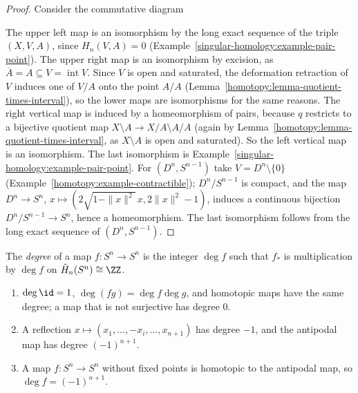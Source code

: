 \begin{proof}
Consider the commutative diagram
\begin{center}
\end{center}
The upper left map is an isomorphism by the long exact sequence of the triple $(X, V, A)$, since $H_n(V, A) = 0$ (Example~\ref{singular-homology:example-pair-point}). The
upper right map is an isomorphism by excision, as $\overline{A} = A \subseteq V = \operatorname{int}V$. Since $V$ is open and saturated, the deformation retraction of $V$
induces one of $V/A$ onto the point $A/A$ (Lemma~\ref{homotopy:lemma-quotient-times-interval}), so the lower maps are isomorphisms for the same reasons. The right
vertical map is induced by a homeomorphism of pairs, because $q$ restricts to a bijective quotient map $X \setminus A \to X/A \setminus A/A$ (again by
Lemma~\ref{homotopy:lemma-quotient-times-interval}, as $X \setminus A$ is open and saturated). So the left vertical map is an isomorphism. The last isomorphism is
Example~\ref{singular-homology:example-pair-point}. For $(D^n, S^{n-1})$ take $V = D^n \setminus \{0\}$ (Example~\ref{homotopy:example-contractible}); $D^n/S^{n-1}$ is
compact, and the map $D^n \to S^n$, $x \mapsto (2\sqrt{1 - \|x\|^2}\,x, 2\|x\|^2 - 1)$, induces a continuous bijection $D^n/S^{n-1} \to S^n$, hence a homeomorphism. The
last isomorphism follows from the long exact sequence of $(D^n, S^{n-1})$.
\end{proof}

\begin{definition}\label{singular-homology:definition-degree}
The \emph{degree} of a map $f \colon S^n \to S^n$ is the integer $\deg f$ such that $f_*$ is multiplication by $\deg f$ on $\tilde{H}_n(S^n) \cong \ZZ$.
\end{definition}

\begin{proposition}\label{singular-homology:proposition-degree}
\begin{enumerate}
\item $\deg \id = 1$, $\deg(fg) = \deg f \deg g$, and homotopic maps have the same degree; a map that is not surjective has degree $0$.
\item A reflection $x \mapsto (x_1, \ldots, -x_i, \ldots, x_{n+1})$ has degree $-1$, and the antipodal map has degree $(-1)^{n+1}$.
\item A map $f \colon S^n \to S^n$ without fixed points is homotopic to the antipodal map, so $\deg f = (-1)^{n+1}$.
\end{enumerate}
\end{proposition}

